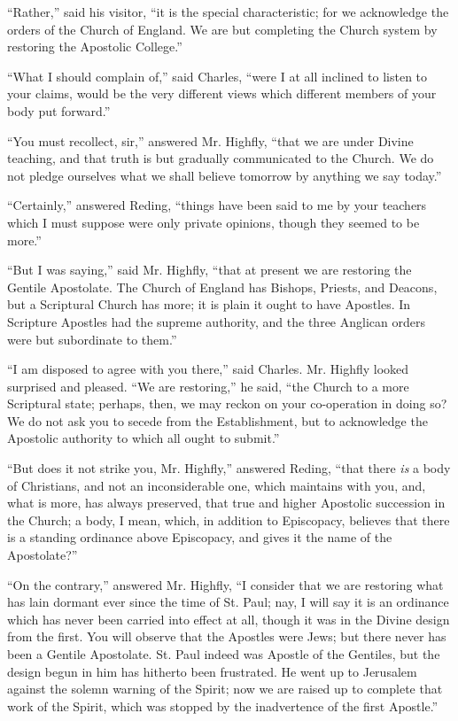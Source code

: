 ``Rather,'' said his visitor, ``it is the special
characteristic; for we acknowledge the orders of the Church of
England. We are but completing the Church system by restoring the
Apostolic College.''

``What I should complain of,'' said Charles, ``were I
at all inclined to listen to your claims, would be the very different
views which different members of your body put forward.''

``You must recollect, sir,'' answered Mr. Highfly,
``that we are under Divine teaching, and that truth is but
gradually communicated to the Church. We do not pledge ourselves
what we shall believe tomorrow by anything we say today.''

``Certainly,'' answered Reding, ``things have been said
to me by your teachers which I must suppose were only private
opinions, though they seemed to be more.''

``But I was saying,'' said Mr. Highfly, ``that at
present we are restoring the Gentile Apostolate. The Church of England
has Bishops, Priests, and Deacons, but a Scriptural Church has more;
it is plain it ought to have Apostles. In Scripture Apostles had the
supreme authority, and the three Anglican orders were but subordinate
to them.''

``I am disposed to agree with you there,'' said Charles.
Mr. Highfly looked surprised and pleased. ``We are
restoring,'' he said, ``the Church to a more Scriptural state;
perhaps, then, we may reckon on your co-operation in doing so? We do
not ask you to secede from the Establishment, but to acknowledge the
Apostolic authority to which all ought to submit.''

``But does it not strike you, Mr. Highfly,'' answered
Reding, ``that there \emph{is} a body of Christians, and not an
inconsiderable one, which maintains with you, and, what is more, has
always preserved, that true and higher Apostolic succession in the
Church; a body, I mean, which, in addition to Episcopacy, believes
that there is a standing ordinance above Episcopacy, and gives it the
name of the Apostolate?''

``On the contrary,'' answered Mr. Highfly, ``I consider
that we are restoring what has lain dormant ever since the time
of St. Paul; nay, I will say it is an ordinance which has never been
carried into effect at all, though it was in the Divine design from
the first. You will observe that the Apostles were Jews; but there
never has been a Gentile Apostolate. St. Paul indeed was Apostle of
the Gentiles, but the design begun in him has hitherto been
frustrated. He went up to Jerusalem against the solemn warning of the
Spirit; now we are raised up to complete that work of the Spirit,
which was stopped by the inadvertence of the first Apostle.''

